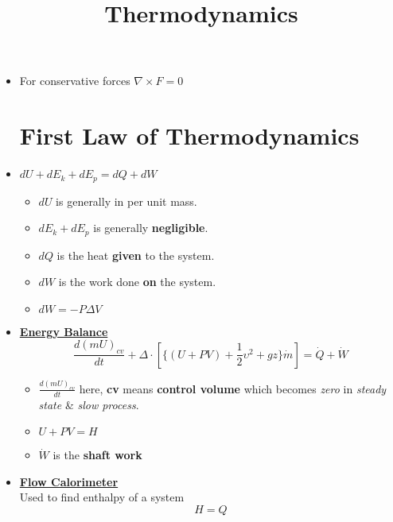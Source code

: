 \documentclass[12pt]{article}
\title{Thermodynamics}
\date{}
\begin{document}
	\maketitle
	\begin{itemize}
		\item For conservative forces $\nabla\times F=0$
		\section{ First Law of Thermodynamics}
		\item $dU + dE_k + dE_p = dQ +dW$
			\begin{itemize}
			\item $dU$ is generally in per unit mass.
			\item $dE_k+dE_p$ is generally \textbf{negligible}.
			\item $dQ$ is the heat \textbf{given} to the system.
			\item $dW$ is the work done \textbf{on} the system.
			\item $dW=-P\Delta V$
			\end{itemize}
		\item \textbf{\underline{Energy Balance}}\\
		 \[\frac{d(mU)_{cv}}{dt} + \Delta \cdot [ \{ (U + PV)+ \frac{1}{2}\upsilon^2 + gz\}\dot{m}]=\dot{Q} + \dot{W}\]
			\begin{itemize}
				\item	$\frac{d(mU)_{cv}}{dt}$ here, \textbf{cv} means \textbf{control volume} which becomes \textit{zero} in \textit{steady state} \& \textit{slow process}.
				\item $U+PV =H$
				\item $\dot{W}$ is the \textbf{shaft work}
			\end{itemize}
			\item \textbf{\underline{Flow Calorimeter}}\\
			Used to find enthalpy of a system\\
			\textbf{\[H=Q\]}\\
			


\begin{tikzpicture}[x=0.75pt,y=0.75pt,yscale=-1,xscale=1]


\end{tikzpicture}
\end{itemize}
\end{document}
